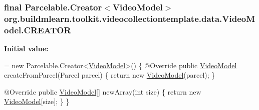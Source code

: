 \subsubsection[{\texorpdfstring{C\+R\+E\+A\+T\+OR}{CREATOR}}]{\setlength{\rightskip}{0pt plus 5cm}final Parcelable.\+Creator$<${\bf Video\+Model}$>$ org.\+buildmlearn.\+toolkit.\+videocollectiontemplate.\+data.\+Video\+Model.\+C\+R\+E\+A\+T\+OR\hspace{0.3cm}{\ttfamily [static]}}\hypertarget{classorg_1_1buildmlearn_1_1toolkit_1_1videocollectiontemplate_1_1data_1_1VideoModel_ac43b05cb32f36a6f4f7b59c63b90873d}{}\label{classorg_1_1buildmlearn_1_1toolkit_1_1videocollectiontemplate_1_1data_1_1VideoModel_ac43b05cb32f36a6f4f7b59c63b90873d}
{\bfseries Initial value\+:}
\begin{DoxyCode}
= \textcolor{keyword}{new} Parcelable.Creator<\hyperlink{classorg_1_1buildmlearn_1_1toolkit_1_1videocollectiontemplate_1_1data_1_1VideoModel_af676748d4f1f6cf496095cbbf524782d}{VideoModel}>() \{
        @Override
        \textcolor{keyword}{public} \hyperlink{classorg_1_1buildmlearn_1_1toolkit_1_1videocollectiontemplate_1_1data_1_1VideoModel_af676748d4f1f6cf496095cbbf524782d}{VideoModel} createFromParcel(Parcel parcel) \{
            \textcolor{keywordflow}{return} \textcolor{keyword}{new} \hyperlink{classorg_1_1buildmlearn_1_1toolkit_1_1videocollectiontemplate_1_1data_1_1VideoModel_af676748d4f1f6cf496095cbbf524782d}{VideoModel}(parcel);
        \}

        @Override
        \textcolor{keyword}{public} \hyperlink{classorg_1_1buildmlearn_1_1toolkit_1_1videocollectiontemplate_1_1data_1_1VideoModel_af676748d4f1f6cf496095cbbf524782d}{VideoModel}[] newArray(\textcolor{keywordtype}{int} size) \{
            \textcolor{keywordflow}{return} \textcolor{keyword}{new} \hyperlink{classorg_1_1buildmlearn_1_1toolkit_1_1videocollectiontemplate_1_1data_1_1VideoModel_af676748d4f1f6cf496095cbbf524782d}{VideoModel}[size];
        \}
    \}
\end{DoxyCode}
